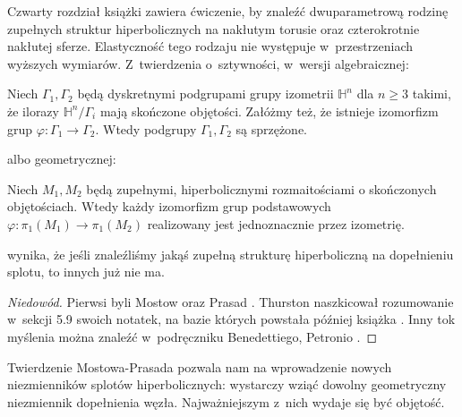 Czwarty rozdział książki \cite{purcell20} zawiera ćwiczenie, by znaleźć dwuparametrową rodzinę zupełnych struktur hiperbolicznych na nakłutym torusie oraz czterokrotnie nakłutej sferze.
Elastyczność tego rodzaju nie występuje w~przestrzeniach wyższych wymiarów.
Z~twierdzenia o~sztywności, w~wersji algebraicznej:

\begin{theorem}
    Niech $\Gamma_1, \Gamma_2$ będą dyskretnymi podgrupami grupy izometrii $\mathbb H^n$ dla $n \ge 3$ takimi, że ilorazy $\mathbb H^n/\Gamma_i$ mają skończone objętości.
    Załóżmy też, że istnieje izomorfizm grup $\varphi \colon \Gamma_1 \to \Gamma_2$.
    Wtedy podgrupy $\Gamma_1, \Gamma_2$ są sprzężone.
\end{theorem}

albo geometrycznej:

\begin{theorem}
    Niech $M_1, M_2$ będą zupełnymi, hiperbolicznymi rozmaitościami o skończonych objętościach.
    Wtedy każdy izomorfizm grup podstawowych $\varphi \colon \pi_1(M_1) \to \pi_1(M_2)$ realizowany jest jednoznacznie przez izometrię.
\end{theorem}

wynika, że jeśli znaleźliśmy jakąś zupełną strukturę hiperboliczną na dopełnieniu splotu, to innych już nie ma.

\begin{proof}[Niedowód]
%
%
%
%
%
Pierwsi byli Mostow \cite{mostow73} oraz Prasad \cite{prasad73}.
    Thurston naszkicował rozumowanie w~sekcji 5.9 swoich notatek, na bazie których powstała później książka \cite{thurston97}.
    Inny tok myślenia można znaleźć w~podręczniku Benedettiego, Petronio \cite[rozdział C]{benedetti92}.
\end{proof}

Twierdzenie Mostowa-Prasada pozwala nam na wprowadzenie nowych niezmienników splotów hiperbolicznych: wystarczy wziąć dowolny geometryczny niezmiennik dopełnienia węzła.
Najważniejszym z~nich wydaje się być objętość.





